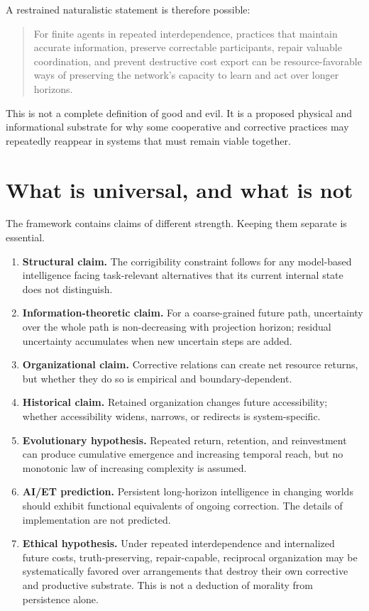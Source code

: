 \documentclass[11pt,a4paper]{article}
\begin{document}
A restrained naturalistic statement is therefore possible:

\begin{quote}
For finite agents in repeated interdependence, practices that maintain accurate information, preserve correctable participants, repair valuable coordination, and prevent destructive cost export can be resource-favorable ways of preserving the network's capacity to learn and act over longer horizons.
\end{quote}

This is not a complete definition of good and evil. It is a proposed physical and informational substrate for why some cooperative and corrective practices may repeatedly reappear in systems that must remain viable together.

\section{What is universal, and what is not}

The framework contains claims of different strength. Keeping them separate is essential.

\begin{enumerate}
  \item \textbf{Structural claim.} The corrigibility constraint follows for any model-based intelligence facing task-relevant alternatives that its current internal state does not distinguish.
  \item \textbf{Information-theoretic claim.} For a coarse-grained future path, uncertainty over the whole path is non-decreasing with projection horizon; residual uncertainty accumulates when new uncertain steps are added.
  \item \textbf{Organizational claim.} Corrective relations can create net resource returns, but whether they do so is empirical and boundary-dependent.
  \item \textbf{Historical claim.} Retained organization changes future accessibility; whether accessibility widens, narrows, or redirects is system-specific.
  \item \textbf{Evolutionary hypothesis.} Repeated return, retention, and reinvestment can produce cumulative emergence and increasing temporal reach, but no monotonic law of increasing complexity is assumed.
  \item \textbf{AI/ET prediction.} Persistent long-horizon intelligence in changing worlds should exhibit functional equivalents of ongoing correction. The details of implementation are not predicted.
  \item \textbf{Ethical hypothesis.} Under repeated interdependence and internalized future costs, truth-preserving, repair-capable, reciprocal organization may be systematically favored over arrangements that destroy their own corrective and productive substrate. This is not a deduction of morality from persistence alone.
\end{enumerate}
\end{document}
